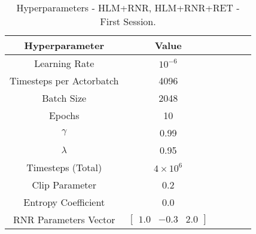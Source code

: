\begin{table}[!htbp]
	\caption{Hyperparameters - HLM+RNR, HLM+RNR+RET - First Session.}
	\begin{center} 
		\begin{tabular}{|c|c|c|c|c|c|}
			\hline
			Hyperparameter & Value   \\
			\hline
			Learning Rate &    $10^{-6}$    \\
			Timesteps per Actorbatch & 4096    \\
			Batch Size &   2048     \\
			Epochs &  10\\
			$\gamma$ & 0.99 \\
			$\lambda$ & 0.95 \\
			Timesteps (Total) & $4 \times 10^{6}$ \\
			Clip Parameter & 0.2\\
			Entropy Coefficient & 0.0 \\
			RNR Parameters Vector  & $\begin{bmatrix}
			1.0 & -0.3 & 2.0
			\end{bmatrix}$\\
			\hline
		\end{tabular}
		
		\label{tab:finaltest}
	\end{center}
\end{table}
